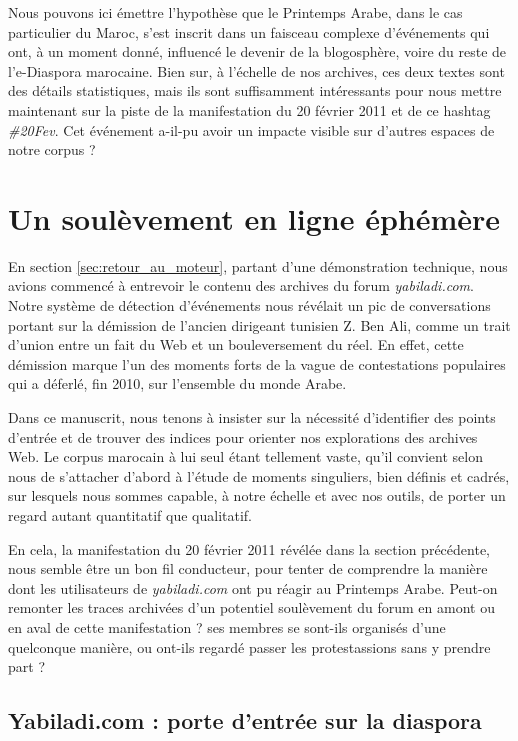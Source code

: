 \documentclass[symmetric,justified,marginals=raggedouter]{tufte-book}
\begin{document}
Nous pouvons ici émettre l'hypothèse que le Printemps Arabe, dans le cas particulier du Maroc, s'est inscrit dans un faisceau complexe d'événements qui ont, à un moment donné, influencé le devenir de la blogosphère, voire du reste de l'e-Diaspora marocaine. Bien sur, à l'échelle de nos archives, ces deux textes sont des détails statistiques, mais ils sont suffisamment intéressants pour nous mettre maintenant sur la piste de la manifestation du 20 février 2011 et de ce hashtag \textit{\#20Fev}. Cet événement a-il-pu avoir un impacte visible sur d'autres espaces de notre corpus ?

\section{Un soulèvement en ligne éphémère}
\label{sec:6_printemps}

\noindent En section \ref{sec:retour_au_moteur}, partant d'une démonstration technique, nous avions commencé à entrevoir le contenu des archives du forum \textit{yabiladi.com}. Notre système de détection d'événements nous révélait un pic de conversations portant sur la démission de l'ancien dirigeant tunisien Z. Ben Ali, comme un trait d'union entre un fait du Web et un bouleversement du réel. En effet, cette démission marque l'un des moments forts de la vague de contestations populaires qui a déferlé, fin 2010, sur l'ensemble du monde Arabe.

Dans ce manuscrit, nous tenons à insister sur la nécessité d'identifier des points d'entrée et de trouver des indices pour orienter nos explorations des archives Web. Le corpus marocain à lui seul étant tellement vaste, qu'il convient selon nous de s'attacher d'abord à l'étude de moments singuliers, bien définis et cadrés, sur lesquels nous sommes capable, à notre échelle et avec nos outils, de porter un regard autant quantitatif que qualitatif. 

En cela, la manifestation du 20 février 2011 révélée dans la section précédente, nous semble être un bon fil conducteur, pour tenter de comprendre la manière dont les utilisateurs de \textit{yabiladi.com} ont pu réagir au Printemps Arabe. Peut-on remonter les traces archivées d'un potentiel soulèvement du forum en amont ou en aval de cette manifestation ? ses membres se sont-ils organisés d'une quelconque manière, ou ont-ils regardé passer les protestassions sans y prendre part ? 

\subsection{Yabiladi.com : porte d'entrée sur la diaspora}
\end{document}
